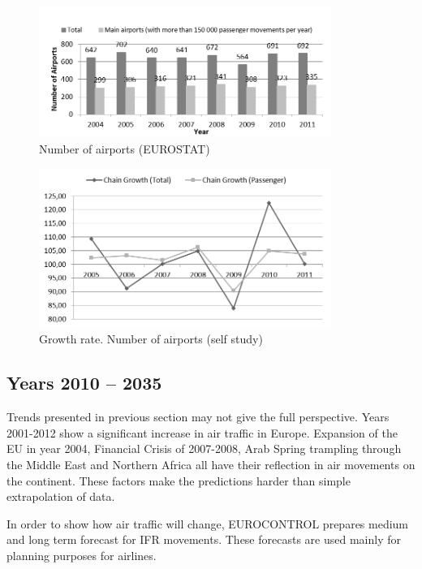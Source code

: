 \begin{figure}[h!]
\centering %
\includegraphics[width=0.85\textwidth]{Pictures/num_aerodrome.png}
\caption{Number of airports (EUROSTAT)}
\label{num_aerodrome}
\end{figure}

\begin{figure}[h!]
\centering %
\includegraphics[width=0.85\textwidth]{Pictures/num_aerodrome2.png}
\caption{Growth rate. Number of airports (self study)}
\label{num_aerodrome2}
\end{figure}

\subsection{Years 2010 -- 2035}

Trends presented in previous section may not give the full perspective. Years 2001-2012 show a significant increase in air traffic in Europe. Expansion of the EU in year 2004, Financial Crisis of 2007-2008, Arab Spring trampling through the Middle East and Northern Africa all have their reflection in air movements on the continent. These factors make the predictions harder than simple extrapolation of data.

In order to show how air traffic will change, EUROCONTROL prepares medium and long term forecast for IFR movements. These forecasts are used mainly for planning purposes for airlines.

